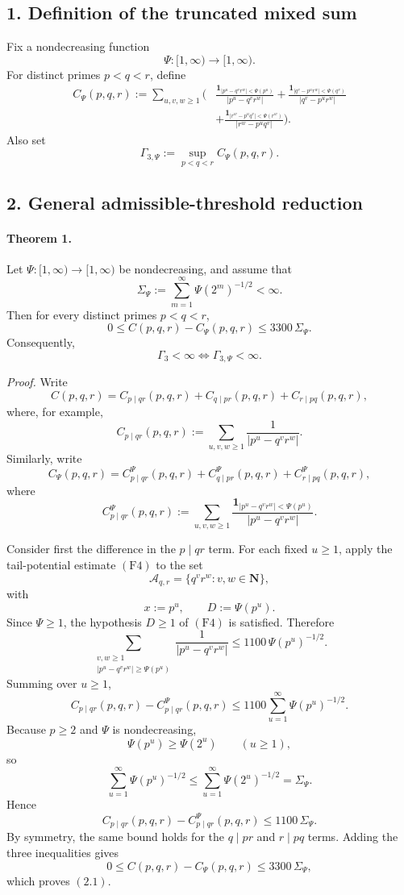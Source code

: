 \subsection*{1. Definition of the truncated mixed sum}

Fix a nondecreasing function
\[
\Psi:[1,\infty)\to [1,\infty).
\]
For distinct primes \(p<q<r\), define
\[
\begin{aligned}
C_\Psi(p,q,r):=
\sum_{u,v,w\ge 1}
\Bigg(
&\frac{\mathbf 1_{|p^u-q^v r^w|<\Psi(p^u)}}{|p^u-q^v r^w|}
+
\frac{\mathbf 1_{|q^v-p^u r^w|<\Psi(q^v)}}{|q^v-p^u r^w|}
\\
&+
\frac{\mathbf 1_{|r^w-p^u q^v|<\Psi(r^w)}}{|r^w-p^u q^v|}
\Bigg).
\end{aligned}
\]
Also set
\[
\Gamma_{3,\Psi}:=\sup_{p<q<r} C_\Psi(p,q,r).
\]

\subsection*{2. General admissible-threshold reduction}

\paragraph{Theorem 1.}
Let \(\Psi:[1,\infty)\to [1,\infty)\) be nondecreasing, and assume that
\[
\Sigma_\Psi:=\sum_{m=1}^{\infty}\Psi(2^m)^{-1/2}<\infty.
\]
Then for every distinct primes \(p<q<r\),
\[
0\le C(p,q,r)-C_\Psi(p,q,r)\le 3300\,\Sigma_\Psi.
\tag{2.1}
\]
Consequently,
\[
\Gamma_3<\infty \iff \Gamma_{3,\Psi}<\infty.
\tag{2.2}
\]

\emph{Proof.}
Write
\[
C(p,q,r)=C_{p\mid qr}(p,q,r)+C_{q\mid pr}(p,q,r)+C_{r\mid pq}(p,q,r),
\]
where, for example,
\[
C_{p\mid qr}(p,q,r):=\sum_{u,v,w\ge 1}\frac{1}{|p^u-q^v r^w|}.
\]
Similarly, write
\[
C_\Psi(p,q,r)=C_{p\mid qr}^{\Psi}(p,q,r)+C_{q\mid pr}^{\Psi}(p,q,r)+C_{r\mid pq}^{\Psi}(p,q,r),
\]
where
\[
C_{p\mid qr}^{\Psi}(p,q,r):=
\sum_{u,v,w\ge 1}
\frac{\mathbf 1_{|p^u-q^v r^w|<\Psi(p^u)}}{|p^u-q^v r^w|}.
\]

Consider first the difference in the \(p\mid qr\) term. For each fixed \(u\ge 1\), apply the tail-potential estimate \((\mathrm{F4})\) to the set
\[
\mathcal A_{q,r}=\{q^v r^w:v,w\in \mathbf N\},
\]
with
\[
x:=p^u,
\qquad
D:=\Psi(p^u).
\]
Since \(\Psi\ge 1\), the hypothesis \(D\ge 1\) of \((\mathrm{F4})\) is satisfied. Therefore
\[
\sum_{\substack{v,w\ge 1\\ |p^u-q^v r^w|\ge \Psi(p^u)}}
\frac{1}{|p^u-q^v r^w|}
\le 1100\,\Psi(p^u)^{-1/2}.
\]
Summing over \(u\ge 1\),
\[
C_{p\mid qr}(p,q,r)-C_{p\mid qr}^{\Psi}(p,q,r)
\le
1100\sum_{u=1}^{\infty}\Psi(p^u)^{-1/2}.
\]
Because \(p\ge 2\) and \(\Psi\) is nondecreasing,
\[
\Psi(p^u)\ge \Psi(2^u)
\qquad (u\ge 1),
\]
so
\[
\sum_{u=1}^{\infty}\Psi(p^u)^{-1/2}
\le
\sum_{u=1}^{\infty}\Psi(2^u)^{-1/2}
=
\Sigma_\Psi.
\]
Hence
\[
C_{p\mid qr}(p,q,r)-C_{p\mid qr}^{\Psi}(p,q,r)
\le 1100\,\Sigma_\Psi.
\]
By symmetry, the same bound holds for the \(q\mid pr\) and \(r\mid pq\) terms. Adding the three inequalities gives
\[
0\le C(p,q,r)-C_\Psi(p,q,r)\le 3300\,\Sigma_\Psi,
\]
which proves \((2.1)\).

